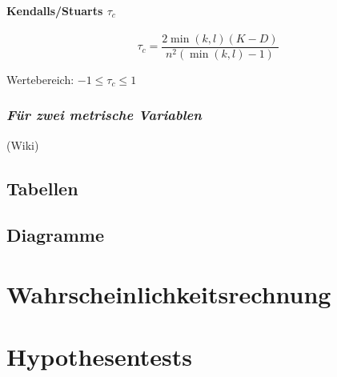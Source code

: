 \documentclass[10pt]{article}
\begin{document}
\begin{multicols}{2}
\paragraph{Kendalls/Stuarts $\tau_c$}

$$\tau_c=\frac{2\min(k,l)(K-D)}{n^2(\min(k,l)-1)}$$

Wertebereich: $-1 \le \tau_c \le 1$


\subsubsection*{\textit{Für zwei metrische Variablen}}

(Wiki)
\end{multicols}

\subsection{Tabellen}

\subsection{Diagramme}





\section{Wahrscheinlichkeitsrechnung}





\section{Hypothesentests}

\end{document}
